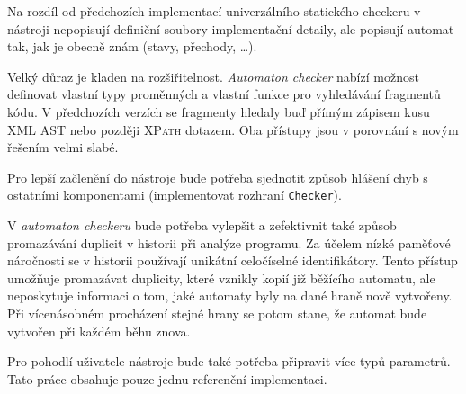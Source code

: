 \documentclass[11pt,final,oneside]{fithesis}
\begin{document}
Na rozdíl od předchozích implementací univerzálního statického checkeru v nástroji nepopisují definiční soubory implementační detaily, ale popisují automat tak, jak je obecně znám (stavy, přechody, \ldots).

Velký důraz je kladen na rozšiřitelnost. \textit{Automaton checker} nabízí možnost definovat vlastní typy proměnných a vlastní funkce pro vyhledávání fragmentů kódu. V předchozích verzích se fragmenty hledaly buď přímým zápisem kusu XML AST nebo později \textsc{XPath} dotazem. Oba přístupy jsou v porovnání s novým řešením velmi slabé.

Pro lepší začlenění do nástroje bude potřeba sjednotit způsob hlášení chyb s ostatními komponentami (implementovat rozhraní \texttt{Checker}).

V \textit{automaton checkeru} bude potřeba vylepšit a zefektivnit také způsob promazávání duplicit v historii při analýze programu. Za účelem nízké paměťové náročnosti se v historii používají unikátní celočíselné identifikátory. Tento přístup umožňuje promazávat duplicity, které vznikly kopií již běžícího automatu, ale neposkytuje informaci o tom, jaké automaty byly na dané hraně nově vytvořeny. Při vícenásobném procházení stejné hrany se potom stane, že automat bude vytvořen při každém běhu znova.

Pro pohodlí uživatele nástroje bude také potřeba připravit více typů parametrů. Tato práce obsahuje pouze jednu referenční implementaci.




\cleardoublepage
{}



\appendix
\end{document}
